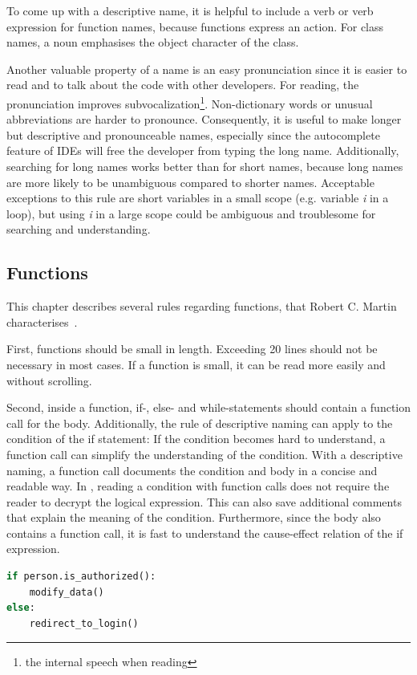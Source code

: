 To come up with a descriptive name, it is helpful to include a verb or verb expression for function names, because functions express an action. For class names, a noun emphasises the object character of the class.

Another valuable property of a name is an easy pronunciation since it is easier to read and to talk about the code with other developers. For reading, the pronunciation improves subvocalization\footnote{the internal speech when reading}. Non-dictionary words or unusual abbreviations are harder to pronounce. Consequently, it is useful to make longer but descriptive and pronounceable names, especially since the autocomplete feature of IDEs will free the developer from typing the long name. Additionally, searching for long names works better than for short names, because long names are more likely to be unambiguous compared to shorter names. Acceptable exceptions to this rule are short variables in a small scope (e.g. variable \textit{i} in a loop), but using \textit{i} in a large scope could be ambiguous and troublesome for searching and understanding.


\subsection{Functions}\label{sec:functions}
This chapter describes several rules regarding functions, that Robert C. Martin characterises~\cite{martin_clean_2009}. 

First, functions should be small in length. Exceeding 20 lines should not be necessary in most cases. If a function is small, it can be read more easily and without scrolling. 

Second, inside a function, if-, else- and while-statements should contain a function call for the body. Additionally, the rule of descriptive naming can apply to the condition of the if statement: If the condition becomes hard to understand, a function call can simplify the understanding of the condition. With a descriptive naming, a function call documents the condition and body in a concise and readable way. In , reading a condition with function calls does not require the reader to decrypt the logical expression. This can also save additional comments that explain the meaning of the condition. Furthermore, since the body also contains a function call, it is fast to understand the cause-effect relation of the if expression. 

\begin{lstlisting}[float=t , language=Python, label=lst:function_method_call, caption={Sample for using functions with if-statements with the increased documentary value of the cause-effect relationship.}]
if person.is_authorized():
    modify_data()
else:
    redirect_to_login()
\end{lstlisting}


